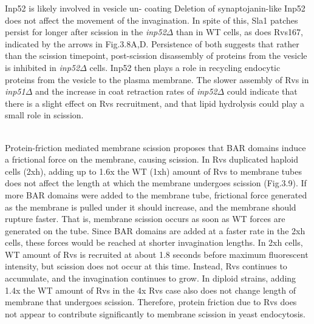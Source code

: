 \documentclass[9pt,lineno]{elife}
\begin{document}
Inp52 is likely involved in vesicle un- coating
Deletion of synaptojanin-like Inp52 does not affect the movement of the invagination. In spite of this, Sla1 patches persist for longer after scission in the \textit{inp52$\Delta$}  than in WT cells, as does Rvs167, indicated by the arrows in Fig.3.8A,D. Persistence of both suggests that rather than the scission timepoint, post-scission disassembly of proteins from the vesicle is inhibited in \textit{inp52$\Delta$} cells. Inp52 then plays a role in recycling endocytic proteins from the vesicle to the plasma membrane. The slower assembly of Rvs in \textit{inp51$\Delta$} and the increase in coat retraction rates of \textit{inp52$\Delta$} could indicate that there is a slight effect on Rvs recruitment, and that lipid hydrolysis could play a small role in scission.

~\\
Protein-friction mediated membrane scission proposes that BAR domains induce a frictional force on the membrane, causing scission. In Rvs duplicated haploid cells (2xh), adding up to 1.6x the WT (1xh) amount of Rvs to membrane tubes does not affect the length at which the membrane undergoes scission (Fig.3.9). If more BAR domains were added to the membrane tube, frictional force generated as the membrane is pulled under it should increase, and the membrane should rupture faster. That is, membrane scission occurs as soon as WT forces are generated on the tube. Since BAR domains are added at a faster rate in the 2xh cells, these forces would be reached at shorter invagination lengths. In 2xh cells, WT amount of Rvs is recruited at about 1.8 seconds before maximum fluorescent intensity, but scission does not occur at this time. Instead, Rvs continues to accumulate, and the invagination continues to grow. In diploid strains, adding 1.4x the WT amount of Rvs in the 4x Rvs case also does not change length of membrane that undergoes scission. Therefore, protein friction due to Rvs does not appear to contribute significantly to membrane scission in yeast endocytosis. 

\end{document}

